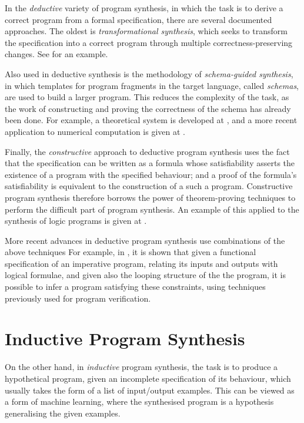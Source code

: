 \documentclass[a4paper,twoside,notitlepage]{report}
\begin{document}
In the \emph{deductive} variety of program synthesis, in which the task is to 
derive a correct program from a formal specification, there are several 
documented approaches. The oldest is \emph{transformational synthesis}, which 
seeks to transform the specification into a correct program through multiple 
correctness-preserving changes. See \cite{cheatham86} for an example.

Also used in deductive synthesis is the methodology of \emph{schema-guided 
synthesis}, in which templates for program fragments in the target language, 
called \emph{schemas}, are used to build a larger program. This reduces the 
complexity of the task, as the work of constructing and proving the 
correctness of the schema has already been done. For example, a theoretical 
system is developed at \cite{flener97}, and a more recent application to 
numerical computation is given at \cite{colon05}.

Finally, the \emph{constructive} approach to deductive program synthesis uses 
the fact that the specification can be written as a formula whose 
satisfiability asserts the existence of a program with the specified 
behaviour; and a proof of the formula's satisfiability is equivalent to the 
construction of a such a program. Constructive program synthesis therefore 
borrows the power of theorem-proving techniques to perform the difficult part 
of program synthesis. An example of this applied to the synthesis of logic 
programs is given at \cite{bundy90}.

More recent advances in deductive program synthesis use combinations of the 
above techniques For example, in \cite{popl10syn}, it is shown that given a 
functional specification of an imperative program, relating its inputs and 
outputs with logical formulae, and given also the looping structure of the the 
program, it is possible to infer a program satisfying these constraints, using 
techniques previously used for program verification.

\section{Inductive Program Synthesis}

On the other hand, in \emph{inductive} program synthesis, the task is to 
produce a hypothetical program, given an incomplete specification of its 
behaviour, which usually takes the form of a list of input/output examples. 
This can be viewed as a form of machine learning, where the synthesised 
program is a hypothesis generalising the given examples.
\end{document}
